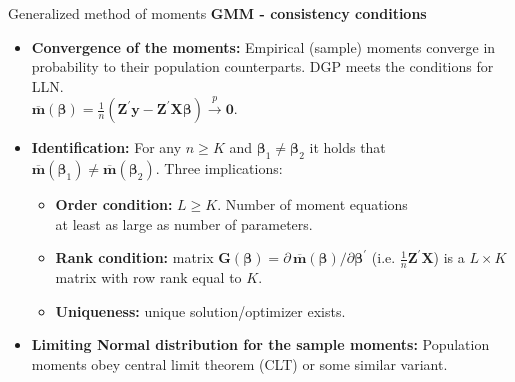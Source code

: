 \documentclass{beamer}
\begin{document}
\begin{frame}{Generalized method of moments}
\textbf{GMM - consistency conditions}\\

\medskip
\begin{itemize}
  \item \textbf{Convergence of the moments:} Empirical (sample) moments converge in probability to their population counterparts. DGP meets the conditions for LLN. \\ \smallskip
  $\overline{\mathbf{m}}(\bm{\beta}) = \frac{1}{n} \left(  \bm{Z}^{\prime} \bm{y} -  \bm{Z}^{\prime} \bm{X}  \bm{\beta} \right) \xrightarrow{p} \bm{0}$.
  \medskip
  \item \textbf{Identification:} For any $n \geq K$ and $\bm{\beta}_1 \neq \bm{\beta}_2$ it holds that $\overline{\mathbf{m}}(\bm{\beta}_1) \neq \overline{\mathbf{m}}(\bm{\beta}_2)$. Three implications:\\
  \medskip
  \begin{itemize}
      \item \textbf{Order condition:} $L \geq K$. Number of moment equations \\at least as large as number of parameters.
      \smallskip
      \item \textbf{Rank condition:} matrix $\bm{G}(\bm{\beta})=\partial \, \overline{\mathbf{m}}(\bm{\beta}) / \partial \bm{\beta}^{\prime}$ (i.e. $\frac{1}{n}\bm{Z}^{\prime} \bm{X}$) is a $L\! \times \! K$ matrix with row rank equal to $K$. %
      \smallskip
      \item \textbf{Uniqueness:} unique solution/optimizer exists.
  \end{itemize}
\medskip
\item \textbf{Limiting Normal distribution for the sample moments:} Population moments obey central limit theorem (CLT) or some similar variant.
\end{itemize}
\end{frame}
\end{document}
